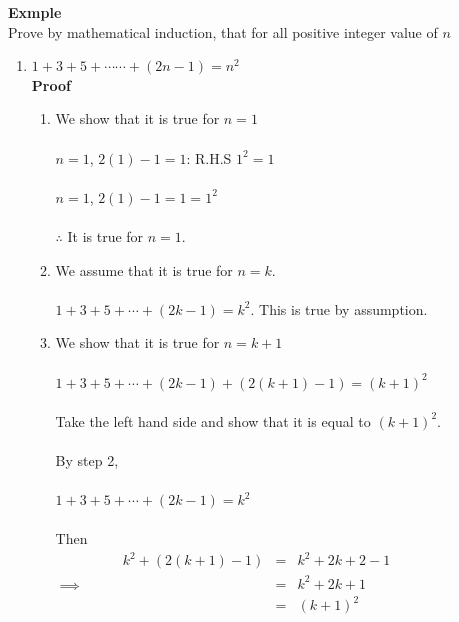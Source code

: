\documentclass[11pt,a4paper]{article}
\begin{document}
\textbf{Exmple}\\
Prove by mathematical induction, that for all positive integer value of $n$
\begin{enumerate}
\item[(a).] $1+3+5+\cdots \cdots +(2n-1)=n^2$\\



\textbf{Proof}
\begin{enumerate}
\item[\textbf{Step 1:}]
We show that it is true for $n=1$\\\\
$n=1$,\hspace{0.5cm} $2(1)-1=1$:\hspace{0.5cm} R.H.S\hspace{0.5cm} $1^2=1$\\\\
$n=1$,\hspace{0.5cm} $2(1)-1=1=1^2$\\\\
$\therefore$\hspace{1cm} It is true for $n=1$.\\
\item[\textbf{Step 2:}] We assume that it is true for $n=k$.\\\\
$1+3+5+\cdots +(2k-1)=k^2$. This is true by assumption.\\
\item[\textbf{Step 3:}] We show that it is true for $n=k+1$\\\\
$1+3+5+\cdots +(2k-1)+(2(k+1)-1)=(k+1)^2$\\\\
Take the left hand side and show that it is equal to $(k+1)^2$.\\\\
By step 2,\\\\
$1+3+5+\cdots +(2k-1)=k^2$\\\\
Then\\
$
\implies \hspace{1cm}
\begin{matrix}
k^2+(2(k+1)-1) & =& k^2+2k+2-1\\
& = & k^2+2k+1\\
& = & (k+1)^2\\
\end{matrix}
$\\\\


\end{enumerate}
\end{enumerate}
\end{document}
